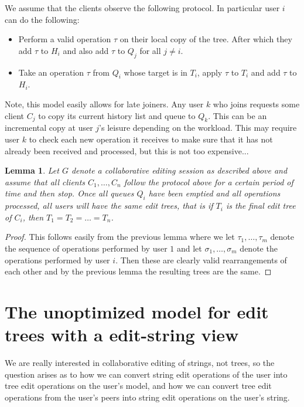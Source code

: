 \documentclass{amsart}
\newtheorem{lemma}[theorem]{Lemma}
\begin{document}
We assume that the clients observe the following protocol. 
In particular user $i$ can do the following:
\begin{itemize}
\item Perform a valid operation $\tau$ on their local copy of the tree.
After which they add $\tau$ to $H_i$ and also add $\tau$ to $Q_j$ for
all $j\ne i$.
\item Take an operation $\tau$ from $Q_i$ whose target is in $T_i$, apply
$\tau$ to $T_i$ and add $\tau$ to $H_i$.
\end{itemize}
Note, this model easily allows for late joiners.  Any user $k$ who joins
requests some client $C_j$ to copy its current history list and queue
to $Q_k$. This can be an incremental copy at user $j$'s leisure depending
on the workload.  This may require user $k$ to check each new operation
it receives to make sure that it has not already been received and processed,
but this is not too expensive...

\begin{lemma}
Let $G$ denote a collaborative editing session as described
above and assume that all clients $C_1,\ldots,C_n$ follow the protocol above
for a certain period of time and then stop. Once all queues $Q_i$ have been
emptied and all operations processed, all users will have the same edit
trees, that is if $T_i$ is the final edit tree of $C_i$, then $T_1=T_2=\ldots=T_n$.
\end{lemma}

\begin{proof}
This follows easily from the previous lemma where we let $\tau_1,\ldots,\tau_m$
denote the sequence of operations performed by user $1$ and let 
$\sigma_1,\ldots,\sigma_m$ denote the operations performed by user $i$. Then
these are clearly valid rearrangements of each other and by the previous
lemma the resulting trees are the same.
\end{proof}



\section{The unoptimized model for edit trees with a edit-string view}
We are really interested in collaborative editing of strings, not trees, so the
question arises as to how we can convert string edit operations of the user
into tree edit operations on the user's model, and how we can convert tree edit
operations from the user's peers into string edit operations on the user's string.
\end{document}

